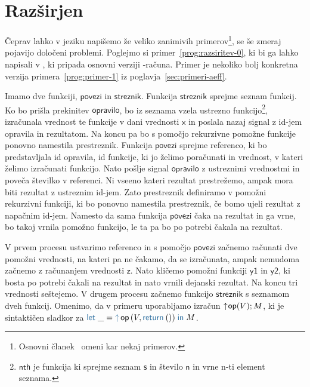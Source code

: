 \section{Razširjen \lae{}}\label{sec:razsirjen-lae}

Čeprav lahko v jeziku \aeff{} napišemo že veliko zanimivih primerov\footnote{Osnovni članek~\cite{aeff} omeni kar nekaj primerov.}, se še zmeraj pojavijo določeni problemi.
Poglejmo si primer~\ref{prog:razsiritev-0}, ki bi ga lahko napisali v \aeff{}, ki pripada osnovni verziji \lae{}\nobreakdash-računa. Primer je nekoliko bolj konkretna verzija primera~\ref{prog:primer-1} iz poglavja~\ref{sec:primeri-aeff}.

Imamo dve funkciji, $\mathsf{povezi}$ in $\mathsf{streznik}$.
Funkcija $\mathsf{streznik}$ sprejme seznam funkcij. Ko bo prišla prekinitev $\mathsf{opravilo}$, bo iz seznama vzela ustrezno funkcijo\footnote{$\mathsf{nth}$ je funkcija ki sprejme seznam $\mathsf{s}$ in število $\mathsf{n}$ in vrne n-ti element seznama.}, izračunala vrednost te funkcije v dani vrednosti $\mathsf{x}$ in poslala nazaj signal z id-jem opravila in rezultatom. Na koncu pa bo s pomočjo rekurzivne pomožne funkcije ponovno namestila prestreznik.
Funkcija $\mathsf{povezi}$ sprejme referenco, ki bo predstavljala id opravila, id funkcije, ki jo želimo poračunati in vrednost, v kateri želimo izračunati funkcijo.
Nato pošlje signal $\mathsf{opravilo}$ z ustreznimi vrednostmi in poveča številko v referenci.
Ni vseeno kateri rezultat prestrežemo, ampak mora biti rezultat z ustreznim id-jem. Zato prestreznik definiramo v pomožni rekurzivni funkciji, ki bo ponovno namestila prestreznik, če bomo ujeli rezultat z napačnim id-jem.
Namesto da sama funkcija $\mathsf{povezi}$ čaka na rezultat in ga vrne, bo takoj vrnila pomožno funkcijo, le ta pa bo po potrebi čakala na rezultat.  

V prvem procesu ustvarimo referenco in s pomočjo $\mathsf{povezi}$ začnemo računati dve pomožni vrednosti, na kateri pa ne čakamo, da se izračunata, ampak nemudoma začnemo z računanjem vrednosti $\mathsf{z}$. Nato kličemo pomožni funkciji $\mathsf{y1}$ in $\mathsf{y2}$, ki bosta po potrebi čakali na rezultat in nato vrnili dejanski rezultat. Na koncu tri vrednosti seštejemo.
V drugem procesu začnemo funkcijo $\mathsf{streznik}$ s seznamom dveh funkcij.
Omenimo, da v primeru uporabljamo izračun $\uparrow\hspace{-0.5ex}\mathsf{op} (V);M$, ki je sintaktičen sladkor za $\tmlet{\_}{\tmopout{op}{V}{\tmreturn{()}}}{M}$.

